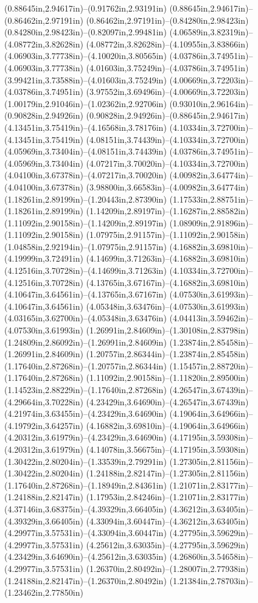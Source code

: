 (0.88645in,2.94617in)--(0.91762in,2.93191in) (0.88645in,2.94617in)--(0.86462in,2.97191in) (0.86462in,2.97191in)--(0.84280in,2.98423in) (0.84280in,2.98423in)--(0.82097in,2.99481in) (4.06589in,3.82319in)--(4.08772in,3.82628in) (4.08772in,3.82628in)--(4.10955in,3.83866in) (4.06903in,3.77738in)--(4.10020in,3.80565in) (4.03786in,3.74951in)--(4.06903in,3.77738in) (4.01603in,3.75249in)--(4.03786in,3.74951in) (3.99421in,3.73588in)--(4.01603in,3.75249in) (4.00669in,3.72203in)--(4.03786in,3.74951in) (3.97552in,3.69496in)--(4.00669in,3.72203in) (1.00179in,2.91046in)--(1.02362in,2.92706in) (0.93010in,2.96164in)--(0.90828in,2.94926in) (0.90828in,2.94926in)--(0.88645in,2.94617in) (4.13451in,3.75419in)--(4.16568in,3.78176in) (4.10334in,3.72700in)--(4.13451in,3.75419in) (4.08151in,3.74439in)--(4.10334in,3.72700in) (4.05969in,3.73404in)--(4.08151in,3.74439in) (4.03786in,3.74951in)--(4.05969in,3.73404in) (4.07217in,3.70020in)--(4.10334in,3.72700in) (4.04100in,3.67378in)--(4.07217in,3.70020in) (4.00982in,3.64774in)--(4.04100in,3.67378in) (3.98800in,3.66583in)--(4.00982in,3.64774in) (1.18261in,2.89199in)--(1.20443in,2.87390in) (1.17533in,2.88751in)--(1.18261in,2.89199in) (1.14209in,2.89197in)--(1.16287in,2.88582in) (1.11092in,2.90158in)--(1.14209in,2.89197in) (1.08909in,2.91896in)--(1.11092in,2.90158in) (1.07975in,2.91157in)--(1.11092in,2.90158in) (1.04858in,2.92194in)--(1.07975in,2.91157in) (4.16882in,3.69810in)--(4.19999in,3.72491in) (4.14699in,3.71263in)--(4.16882in,3.69810in) (4.12516in,3.70728in)--(4.14699in,3.71263in) (4.10334in,3.72700in)--(4.12516in,3.70728in) (4.13765in,3.67167in)--(4.16882in,3.69810in) (4.10647in,3.64561in)--(4.13765in,3.67167in) (4.07530in,3.61993in)--(4.10647in,3.64561in) (4.05348in,3.63476in)--(4.07530in,3.61993in) (4.03165in,3.62700in)--(4.05348in,3.63476in) (4.04413in,3.59462in)--(4.07530in,3.61993in) (1.26991in,2.84609in)--(1.30108in,2.83798in) (1.24809in,2.86092in)--(1.26991in,2.84609in) (1.23874in,2.85458in)--(1.26991in,2.84609in) (1.20757in,2.86344in)--(1.23874in,2.85458in) (1.17640in,2.87268in)--(1.20757in,2.86344in) (1.15457in,2.88720in)--(1.17640in,2.87268in) (1.11092in,2.90158in)--(1.11820in,2.89500in) (1.14523in,2.88229in)--(1.17640in,2.87268in) (4.26547in,3.67439in)--(4.29664in,3.70228in) (4.23429in,3.64690in)--(4.26547in,3.67439in) (4.21974in,3.63455in)--(4.23429in,3.64690in) (4.19064in,3.64966in)--(4.19792in,3.64257in) (4.16882in,3.69810in)--(4.19064in,3.64966in) (4.20312in,3.61979in)--(4.23429in,3.64690in) (4.17195in,3.59308in)--(4.20312in,3.61979in) (4.14078in,3.56675in)--(4.17195in,3.59308in) (1.30422in,2.80204in)--(1.33539in,2.79291in) (1.27305in,2.81156in)--(1.30422in,2.80204in) (1.24188in,2.82147in)--(1.27305in,2.81156in) (1.17640in,2.87268in)--(1.18949in,2.84361in) (1.21071in,2.83177in)--(1.24188in,2.82147in) (1.17953in,2.84246in)--(1.21071in,2.83177in) (4.37146in,3.68375in)--(4.39329in,3.66405in) (4.36212in,3.63405in)--(4.39329in,3.66405in) (4.33094in,3.60447in)--(4.36212in,3.63405in) (4.29977in,3.57531in)--(4.33094in,3.60447in) (4.27795in,3.59629in)--(4.29977in,3.57531in) (4.25612in,3.63035in)--(4.27795in,3.59629in) (4.23429in,3.64690in)--(4.25612in,3.63035in) (4.26860in,3.54658in)--(4.29977in,3.57531in) (1.26370in,2.80492in)--(1.28007in,2.77938in) (1.24188in,2.82147in)--(1.26370in,2.80492in) (1.21384in,2.78703in)--(1.23462in,2.77850in) 